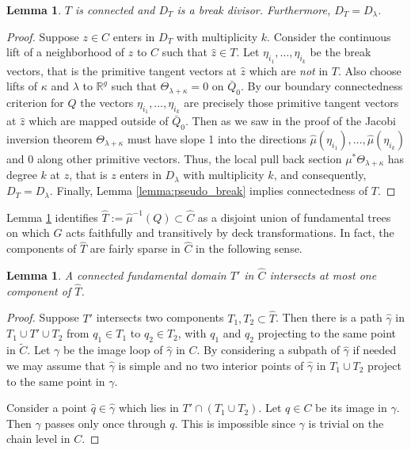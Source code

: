\documentclass[12pt]{amsart}
\theoremstyle{plain}
\newtheorem{lemma}[theorem]{Lemma}
\theoremstyle{definition}
\theoremstyle{remark}
\newcommand{\R}{\mathbb R}    %
\newcommand{\<}{\langle}   %
\renewcommand{\>}{\rangle} %
\begin{document}
\begin{lemma}\label{lemma:D_lambda}
$T$ is connected and $D_T$ is a break divisor. Furthermore, $D_T=D_\lambda$.
\end{lemma}
\begin{proof}
Suppose $z\in C$ enters in $D_T$ with multiplicity $k$. Consider the continuous lift of a neighborhood of $z$ to $\hat C$ such that $\hat z\in T$. Let $\eta_{i_1},\dots,\eta_{i_k}$ be the break vectors, that is the primitive tangent vectors at $\hat z$ which are {\em not} in $T$.
Also choose lifts of $\kappa$ and $\lambda$ to $\R^g$ such that $\Theta_{\lambda+\kappa}=0$ on $\bar Q_0$. By our boundary connectedness criterion for $Q$ the vectors $\eta_{i_1},\dots,\eta_{i_k}$ are precisely those primitive tangent vectors at $\hat z$ which are mapped outside of $\bar Q_0$. Then as we saw in the proof of the Jacobi inversion theorem $\Theta_{\lambda+\kappa}$ must have slope 1 into the directions $\hat \mu (\eta_{i_1}),\dots,\hat \mu (\eta_{i_k})$ and 0 along other primitive vectors.
Thus, the local pull back section $\mu^*\Theta_{\lambda+\kappa}$ has degree $k$ at $z$, that is $z$ enters in $D_\lambda$ with multiplicity $k$, and consequently, $D_T=D_\lambda$. Finally, Lemma \ref{lemma:pseudo_break} implies connectedness of $T$.
\end{proof}

Lemma \ref{lemma:D_lambda} identifies $\hat T:=\hat \mu^{-1}(Q)\subset \hat C$ as a disjoint union of fundamental trees on which $G$ acts faithfully and transitively by deck transformations. In fact, the components of $\hat T$ are fairly sparse in $\hat C$ in the following sense.
\begin{lemma}\label{lemma:covering}
A connected fundamental domain $T'$ in $\hat C$ intersects at most one component of $\hat T$.
\end{lemma}
\begin{proof}
Suppose $T'$ intersects two components $T_1,T_2 \subset \hat T$. Then there is a path $\hat \gamma$ in $T_1\cup T' \cup T_2$ from $q_1\in T_1$ to $q_2\in T_2$, with $q_1$ and $q_2$ projecting to the same point  in $\tilde C$. Let $\gamma$ be the image loop of $\hat\gamma$ in $C$. By considering a subpath of $\hat \gamma$ if needed we may assume that $\hat \gamma$ is simple and no two interior points of $\hat \gamma$ in $T_1 \cup T_2$ project to the same point in $\gamma$.

Consider a point $\hat q \in \hat \gamma$ which lies in $T'\cap(T_1 \cup T_2)$. Let $q\in C$ be its image in $\gamma$. Then $\gamma$ passes only once through $q$. This is impossible since $\gamma$ is trivial on the chain level in $C$.
\end{proof}
\end{document}
